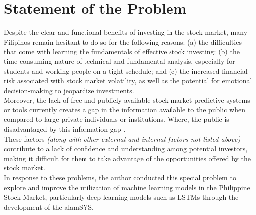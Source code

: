 \section{Statement of the Problem}
\label{sec:problem}
Despite the clear and functional benefits of investing in the stock market, 
many Filipinos remain hesitant to do so for the following reasons:
(a) the difficulties that come with learning the fundamentals 
of effective stock investing;
(b) the time-consuming nature of technical and fundamental analysis, 
especially for students and working people on a tight schedule; and
(c) the increased financial risk associated with stock market volatility, 
as well as the potential for emotional decision-making to jeopardize investments.
\\

Moreover, the lack of free and publicly available stock market predictive systems or tools 
currently creates a gap in the information available to the public when compared 
to large private individuals or institutions. Where, the public is 
disadvantaged by this information gap \cite{Kim2022}. 
\\

These factors \textit{(along with other external and internal factors not listed above)}
contribute to a lack of confidence and understanding among potential investors, 
making it difficult for them to take advantage of the opportunities offered 
by the stock market.
\\

In response to these problems, the author conducted this special problem to 
explore and improve the utilization of machine learning models in the 
Philippine Stock Market, particularly deep learning models such as LSTMs through
the development of the alamSYS.